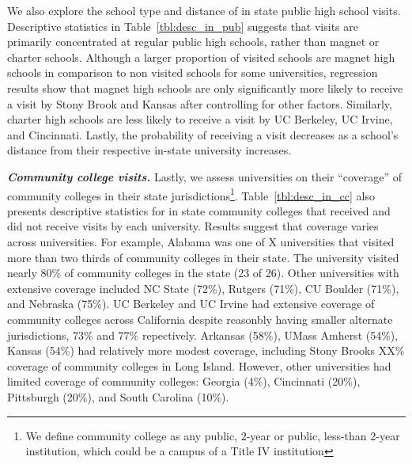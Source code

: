 \documentclass[twoside]{article}
\begin{document}
We also explore the school type and distance of in state public high school visits. Descriptive statistics in Table~\ref{tbl:desc_in_pub} suggests that visits are primarily concentrated at regular public high schools, rather than magnet or charter schools. Although a larger proportion of visited schools are magnet high schools in comparison to non visited schools for some universities, regression results show that magnet high schools are only significantly more likely to receive a visit by Stony Brook and Kansas after controlling for other factors. Similarly, charter high schools are less likely to receive a visit by UC Berkeley, UC Irvine, and Cincinnati.  Lastly, the probability of receiving a visit decreases as a school’s distance from their respective in-state university increases.

\textbf{\textit{Community college visits.}} Lastly, we assess universities on their “coverage” of community colleges in their state jurisdictions\footnote{We define community college as any public, 2-year or public, less-than 2-year institution, which could be a campus of a Title IV institution}. Table~\ref{tbl:desc_in_cc} also presents descriptive statistics for in state community colleges that received and did not receive visits by each university. Results suggest that coverage varies across universities. For example, Alabama was one of X universities that visited more than two thirds of community colleges in their state. The university visited nearly 80\% of community colleges in the state (23 of 26). Other universities with extensive coverage included NC State (72\%), Rutgers (71\%), CU Boulder (71\%), and Nebraska (75\%).  UC Berkeley and UC Irvine had extensive coverage of community colleges across California despite reasonbly having smaller alternate jurisdictions, 73\% and 77\% repectively. Arkansas (58\%), UMass Amherst (54\%), Kansas (54\%) had relatively more modest coverage, including Stony Brooks XX\% coverage of community colleges in Long Island. However, other universities had limited coverage of community colleges: Georgia (4\%), Cincinnati (20\%), Pittsburgh (20\%), and South Carolina (10\%).
\end{document}
